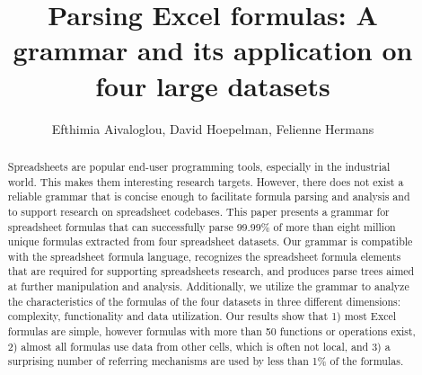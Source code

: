 \documentclass[times]{smrauth}
\begin{document}

\title{Parsing Excel formulas: A grammar and its application on four large datasets}

\author{Efthimia Aivaloglou\corrauth, David Hoepelman, Felienne Hermans}

\address{Software Engineering Research Group, Delft University of Technology, Mekelweg 4, 2628 CD, Delft, The Netherlands}


\begin{abstract}
Spreadsheets are popular end-user programming tools, especially in the industrial world. This makes them interesting research targets. However, there does not exist a reliable grammar that is concise enough to facilitate formula parsing and analysis and to support research on spreadsheet codebases.
This paper presents a grammar for spreadsheet formulas that can successfully parse 99.99\% of more than eight million unique formulas extracted from four spreadsheet datasets. Our grammar is compatible with the spreadsheet formula language, recognizes the spreadsheet formula elements that are required for supporting spreadsheets research, and produces parse trees aimed at further manipulation and analysis. 
Additionally, we utilize the grammar to analyze the characteristics of the formulas of the four datasets in three different dimensions: complexity, functionality and  data utilization. Our results show that 1)
most Excel formulas are simple, however formulas with more than 50 functions or operations exist,
 2) almost all formulas use data from other cells, which is often not local, and
 3) a surprising number of referring mechanisms are used by less than 1\% of the formulas.
\end{abstract}


\maketitle
\end{document}
